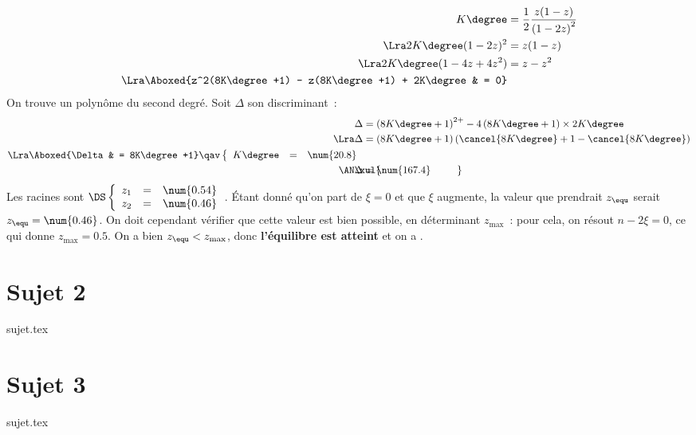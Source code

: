 \documentclass[a4paper, 11pt]{book}
\begin{document}
{\begin{align*}
		K\degree                                                & = \frac{1}{2} \frac{z(1-z)}{\left( 1 - 2z \right)^2}
		\\\Lra
		2K\degree(1-2z)^2                                       & = z(1-z)
		\\\Lra
		2K\degree(1-4z + 4z^2)                                  & = z - z^2
		\\\Lra
		\Aboxed{z^2(8K\degree +1) - z(8K\degree +1) + 2K\degree & = 0}
	\end{align*}
	On trouve un polynôme du second degré. Soit $\Delta$ son discriminant~:
	\begin{align*}
		\Delta         & = \left( 8K\degree+1 \right)^{2+} -
		4\left(8K\degree+1\right)\times 2K\degree
		\\\Lra
		\Delta         & = \left( 8K\degree+1 \right)\left(
		\cancel{8K\degree}+1-\cancel{8K\degree} \right)
		\\\Lra
		\Aboxed{\Delta & = 8K\degree+1}
		\qav
		\left\{
		\begin{array}{rcl}
			K\degree & = & \num{20.8}
		\end{array}
		\right.                                              \\
		\makebox[0pt][l]{$\phantom{\AN}\xul{\phantom{\Delta = \num{167.4}}}$}
		\AN
		\Delta         & = \num{167.4}
	\end{align*}
	Les racines sont
	$\DS\left\{
		\begin{array}{rcl}
			z_1 & = & \num{0.54} \\
			z_2 & = & \num{0.46}
		\end{array}
		\right.$.
	\bigbreak
	Étant donné qu'on part de $\xi = 0$ et que $\xi$ augmente, la valeur que
	prendrait $z_{\equ}$ serait $z_{\equ} = \num{0.46}$. On doit cependant
	vérifier que cette valeur est bien possible, en déterminant $z_{\max}$~:
	pour cela, on résout $n-2\xi = 0$, ce qui donne $z_{\max} = \num{0.5}$.
	On a bien $z_{\equ} < z_{\max}$, donc \textbf{l'équilibre est atteint} et
	on a .
}

\resetQ
\newpage

\chapter{Sujet 2}

{sujet.tex}

\resetQ
\newpage

\chapter{Sujet 3}

{sujet.tex}
\end{document}
